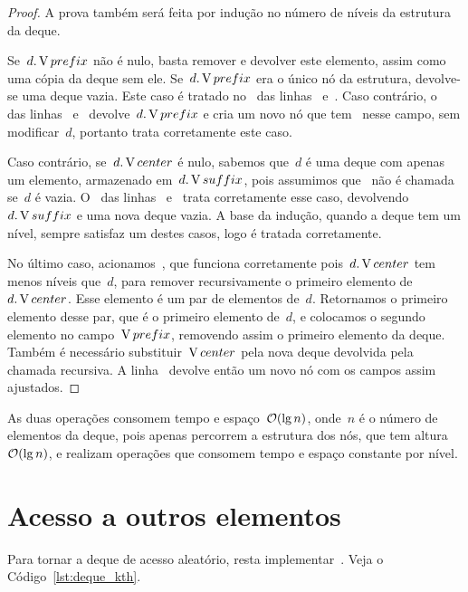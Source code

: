 \documentclass[main.tex]{subfiles}
\begin{document}
\begin{proof}
A prova também será feita por indução no número de níveis da estrutura da deque.

    Se~$d.\operatorname{V}{prefix}$ não é nulo, basta remover e devolver este elemento, assim como uma cópia da deque sem ele. Se~$d.\operatorname{V}{prefix}$ era o único nó da estrutura, devolve-se uma deque vazia. Este caso é tratado no~ das linhas~ e~. Caso contrário, o~ das linhas~ e~ devolve~$d.\operatorname{V}{prefix}$ e cria um novo nó que tem~ nesse campo, sem modificar~$d$, portanto trata corretamente este caso.

Caso contrário, se~$d.\operatorname{V}{center}$ é nulo, sabemos que~$d$ é uma deque com apenas um elemento, armazenado em~$d.\operatorname{V}{suffix}$, pois assumimos que~ não é chamada se~$d$ é vazia. O~ das linhas~ e~ trata corretamente esse caso, devolvendo~$d.\operatorname{V}{suffix}$ e uma nova deque vazia. A base da indução, quando a deque tem um nível, sempre satisfaz um destes casos, logo é tratada corretamente.

No último caso, acionamos~, que funciona corretamente pois~$d.\operatorname{V}{center}$ tem menos níveis que~$d$, para remover recursivamente o primeiro elemento de~$d.\operatorname{V}{center}$. Esse elemento é um par de elementos de~$d$. Retornamos o primeiro elemento desse par, que é o primeiro elemento de~$d$, e colocamos o segundo elemento no campo~$\operatorname{V}{prefix}$, removendo assim o primeiro elemento da deque. Também é necessário substituir~$\operatorname{V}{center}$ pela nova deque devolvida pela chamada recursiva. A linha~ devolve então um novo nó com os campos assim ajustados.
\end{proof}

As duas operações consomem tempo e espaço~$\mathcal{O}(\lg n)$, onde~$n$ é o número de elementos da deque, pois apenas percorrem a estrutura dos nós, que tem altura~$\mathcal{O}(\lg n)$, e realizam operações que consomem tempo e espaço constante por nível.

\section{Acesso a outros elementos}

Para tornar a deque de acesso aleatório, resta implementar~. Veja o Código~\ref{lst:deque_kth}.
\end{document}
